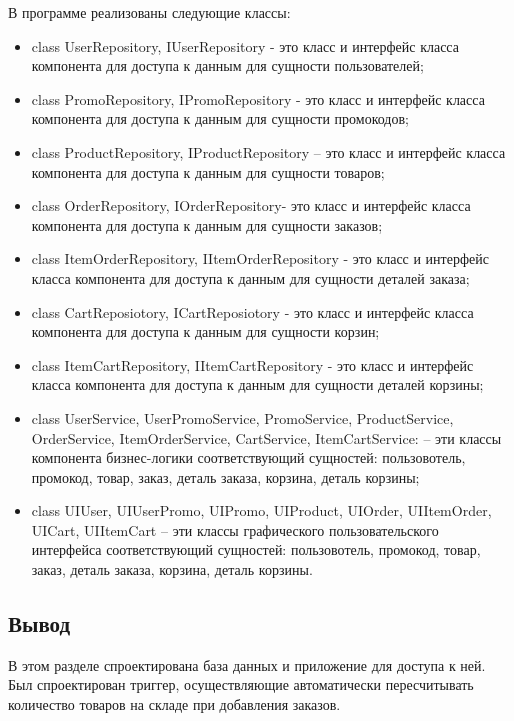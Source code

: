 В программе реализованы следующие классы:
\begin{itemize}[label=---]
	\item class UserRepository, IUserRepository - это класс и интерфейс класса компонента для доступа к данным для сущности пользователей; 
	\item class PromoRepository, IPromoRepository - это класс и интерфейс класса компонента для доступа к данным для сущности промокодов; 
	\item class ProductRepository, IProductRepository -- это класс и интерфейс класса компонента для доступа к данным для сущности товаров;  
	\item class OrderRepository, IOrderRepository- это класс и интерфейс класса компонента для доступа к данным для сущности заказов; 
	\item class ItemOrderRepository, IItemOrderRepository - это класс и интерфейс класса компонента для доступа к данным для сущности деталей заказа; 
	\item class CartReposiotory, ICartReposiotory - это класс и интерфейс класса компонента для доступа к данным для сущности корзин; 
	\item class ItemCartRepository, IItemCartRepository - это класс и интерфейс класса компонента для доступа к данным для сущности деталей корзины;  
	\item class UserService, UserPromoService, PromoService, ProductService, \newline OrderService, ItemOrderService, CartService, ItemCartService: -- эти классы компонента бизнес-логики соответствующий сущностей: пользовотель, промокод, товар, заказ, деталь заказа, корзина, деталь корзины;
	\item class UIUser, UIUserPromo, UIPromo, UIProduct, UIOrder, UIItemOrder, UICart, UIItemCart -- эти классы графического пользовательского интерфейса соответствующий сущностей: пользовотель, промокод, товар, заказ, деталь заказа, корзина, деталь корзины.
\end{itemize}

\subsection*{Вывод} 
В этом разделе спроектирована база данных и приложение для доступа к ней. Был спроектирован триггер, осуществляющие автоматически пересчитывать количество товаров на складе при добавления заказов.
